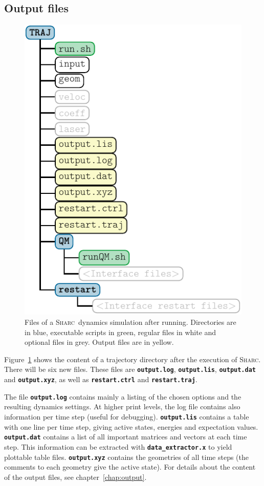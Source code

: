 \documentclass[a4paper,10pt,DIV=15,openany]{scrbook}
\newcommand{\sharc}{\textsc{Sharc}}
\newcommand{\ttt}[1]{\textbf{\texttt{#1}}}
\begin{document}
\subsection{Output files}

\begin{figure}[htb]
  \centering
  \includegraphics[scale=1]{img/dir_traj/dir_traj_after.pdf}
  \caption[Files of a \sharc\ dynamics simulation after running.]{Files of a \sharc\ dynamics simulation after running. Directories are in blue, executable scripts in green, regular files in white and optional files in grey. Output files are in yellow.}
  \label{fig:dir_traj_after}
\end{figure}

Figure~\ref{fig:dir_traj_after} shows the content of a trajectory directory after the execution of \sharc. There will be six new files. These files are \ttt{output.log}, \ttt{output.lis}, \ttt{output.dat} and \ttt{output.xyz}, as well as \ttt{restart.ctrl} and \ttt{restart.traj}.

The file \ttt{output.log} contains mainly a listing of the chosen options and the resulting dynamics settings. At higher print levels, the log file contains also information per time step (useful for debugging). \ttt{output.lis} contains a table with one line per time step, giving active states, energies and expectation values. \ttt{output.dat} contains a list of all important matrices and vectors at each time step. This information can be extracted with \ttt{data\_extractor.x} to yield plottable table files. \ttt{output.xyz} contains the geometries of all time steps (the comments to each geometry give the active state).
For details about the content of the output files, see chapter~\ref{chap:output}.
\end{document}
